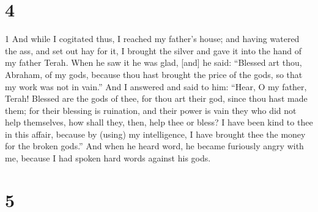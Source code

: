 \chapter{4}

\par 1 And while I cogitated thus, I reached my father's house; and having watered the ass, and set out hay for it, I brought the silver and gave it into the hand of my father Terah. When he saw it he was glad, [and] he said: “Blessed art thou, Abraham, of my gods, because thou hast brought the price of the gods, so that my work was not in vain.” And I answered and said to him: “Hear, O my father, Terah! Blessed are the gods of thee, for thou art their god, since thou hast made them; for their blessing is ruination, and their power is vain they who did not help themselves, how shall they, then, help thee or bless? I have been kind to thee in this affair, because by (using) my intelligence, I have brought thee the money for the broken gods.” And when he heard word, he became furiously angry with me, because I had spoken hard words against his gods.

\chapter{5}

